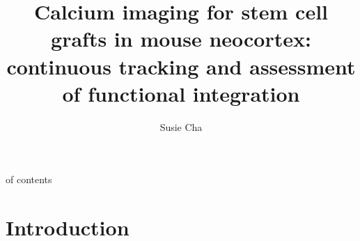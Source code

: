 \title{Calcium imaging for stem cell grafts in mouse neocortex: continuous tracking and assessment of functional integration}
\author{Susie Cha}



\maketitle
\table of contents
\section{Introduction}